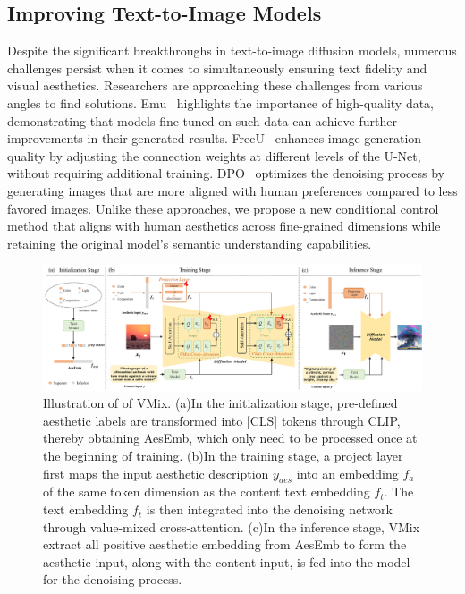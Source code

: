 \subsection{Improving Text-to-Image Models} 
Despite the significant breakthroughs in text-to-image diffusion models, numerous challenges persist when it comes to simultaneously ensuring text fidelity and visual aesthetics. Researchers are approaching these challenges from various angles to find solutions. Emu~\cite{dai2023emu} highlights the importance of high-quality data, demonstrating that models fine-tuned on such data can achieve further improvements in their generated results. FreeU~\cite{si2023freeu} enhances image generation quality by adjusting the connection weights at different levels of the U-Net, without requiring additional training. DPO~\cite{wallace2024diffusion} optimizes the denoising process by generating images that are more aligned with human preferences compared to less favored images. Unlike these approaches, we propose a new conditional control method that aligns with human aesthetics across fine-grained dimensions while retaining the original model's semantic understanding capabilities.

\begin{figure}[ht]
	\centerline{\includegraphics[scale=0.46]{overall_framework2.pdf}}
	\caption{Illustration of of VMix. (a)In the initialization stage, pre-defined aesthetic labels are transformed into [CLS] tokens through CLIP, thereby obtaining AesEmb, which only need to be processed once at the beginning of training. (b)In the training stage, a project layer first maps the input aesthetic description $y_{aes}$ into an embedding $f_a$ of the same token dimension as the content text embedding $f_t$. The text embedding $f_t$ is then integrated into the denoising network through value-mixed cross-attention. (c)In the inference stage, VMix extract all positive aesthetic embedding from AesEmb to form the aesthetic input, along with the content input, is fed into the model for the denoising process.}
	\label{Figure 1}
\end{figure}


